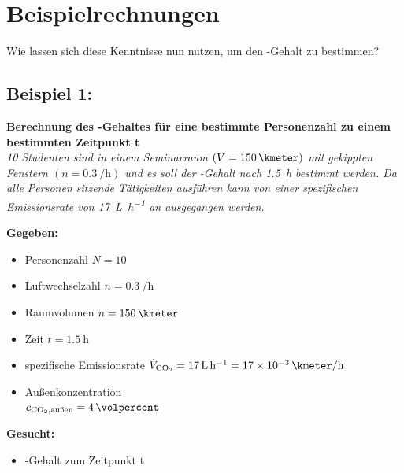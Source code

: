 \section{Beispielrechnungen}
Wie lassen sich diese Kenntnisse nun nutzen, um den -Gehalt zu bestimmen?

\subsection*{Beispiel 1:}
\textbf{Berechnung des -Gehaltes für eine bestimmte Personenzahl zu einem bestimmten Zeitpunkt t}\\

\textit{10 Studenten sind in einem Seminarraum $\left(V = \SI{150}{\kmeter}\right)$ mit gekippten Fenstern $\left(n = \SI{0,3}{\per \hour}\right)$ und es soll der -Gehalt nach \SI{1,5}{\hour} bestimmt werden. Da alle Personen sitzende Tätigkeiten ausführen kann von einer spezifischen Emissionsrate von \SI{17}{\liter\per\hour} an  ausgegangen werden.}\\

\begin{minipage}[t]{0.45\textwidth}
	\textbf{Gegeben:}
	\begin{itemize}
		\item Personenzahl $N = 10$
		\item Luftwechselzahl $n = \SI{0,3}{\per \hour}$
		\item Raumvolumen $n = \SI{150}{\kmeter}$
		\item Zeit $t = \SI{1,5}{\hour}$
	\end{itemize}
\end{minipage}
\begin{minipage}[t]{0.5\textwidth}
	\textbf{}
	\begin{itemize}
		\item spezifische Emissionsrate $\dot{V}_{\ce{CO2}} = \SI{17}{\liter \per \hour} = \SI{17e-3}{\kmeter \per \hour}  $
		\item Außenkonzentration  \\
		$c_{\ce{CO2}, \text{außen}} = \SI{4}{\volpercent}$
	\end{itemize}
\end{minipage}
\FloatBarrier

\vspace*{5mm}

\begin{minipage}[t]{0.7\textwidth}
	\textbf{Gesucht:}
	\begin{itemize}
		\item {}-Gehalt zum Zeitpunkt t
	\end{itemize}
\end{minipage}

